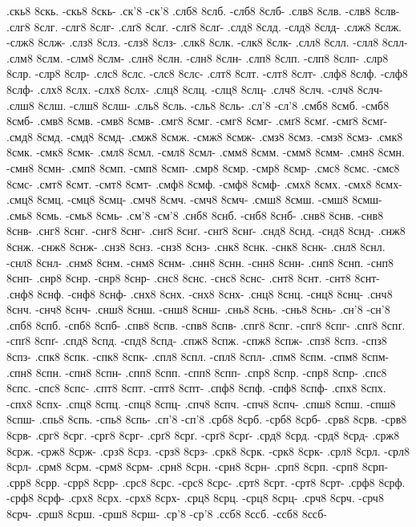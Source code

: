 {.скь8 8скь. -скь8 8скь-
.ск'8 -ск'8
.слб8 8слб. -слб8 8слб-
.слв8 8слв. -слв8 8слв-
.слг8 8слг. -слг8 8слг-
.слґ8 8слґ. -слґ8 8слґ-
.слд8 8слд. -слд8 8слд-
.слж8 8слж. -слж8 8слж-
.слз8 8слз. -слз8 8слз-
.слк8 8слк. -слк8 8слк-
.слл8 8слл. -слл8 8слл-
.слм8 8слм. -слм8 8слм-
.слн8 8слн. -слн8 8слн-
.слп8 8слп. -слп8 8слп-
.слр8 8слр. -слр8 8слр-
.слс8 8слс. -слс8 8слс-
.слт8 8слт. -слт8 8слт-
.слф8 8слф. -слф8 8слф-
.слх8 8слх. -слх8 8слх-
.слц8 8слц. -слц8 8слц-
.слч8 8слч. -слч8 8слч-
.слш8 8слш. -слш8 8слш-
.сль8 8сль. -сль8 8сль-
.сл'8 -сл'8
.смб8 8смб. -смб8 8смб-
.смв8 8смв. -смв8 8смв-
.смг8 8смг. -смг8 8смг-
.смґ8 8смґ. -смґ8 8смґ-
.смд8 8смд. -смд8 8смд-
.смж8 8смж. -смж8 8смж-
.смз8 8смз. -смз8 8смз-
.смк8 8смк. -смк8 8смк-
.смл8 8смл. -смл8 8смл-
.смм8 8смм. -смм8 8смм-
.смн8 8смн. -смн8 8смн-
.смп8 8смп. -смп8 8смп-
.смр8 8смр. -смр8 8смр-
.смс8 8смс. -смс8 8смс-
.смт8 8смт. -смт8 8смт-
.смф8 8смф. -смф8 8смф-
.смх8 8смх. -смх8 8смх-
.смц8 8смц. -смц8 8смц-
.смч8 8смч. -смч8 8смч-
.смш8 8смш. -смш8 8смш-
.смь8 8смь. -смь8 8смь-
.см'8 -см'8
.снб8 8снб. -снб8 8снб-
.снв8 8снв. -снв8 8снв-
.снг8 8снг. -снг8 8снг-
.снґ8 8снґ. -снґ8 8снґ-
.снд8 8снд. -снд8 8снд-
.снж8 8снж. -снж8 8снж-
.снз8 8снз. -снз8 8снз-
.снк8 8снк. -снк8 8снк-
.снл8 8снл. -снл8 8снл-
.снм8 8снм. -снм8 8снм-
.снн8 8снн. -снн8 8снн-
.снп8 8снп. -снп8 8снп-
.снр8 8снр. -снр8 8снр-
.снс8 8снс. -снс8 8снс-
.снт8 8снт. -снт8 8снт-
.снф8 8снф. -снф8 8снф-
.снх8 8снх. -снх8 8снх-
.снц8 8снц. -снц8 8снц-
.снч8 8снч. -снч8 8снч-
.снш8 8снш. -снш8 8снш-
.снь8 8снь. -снь8 8снь-
.сн'8 -сн'8
.спб8 8спб. -спб8 8спб-
.спв8 8спв. -спв8 8спв-
.спг8 8спг. -спг8 8спг-
.спґ8 8спґ. -спґ8 8спґ-
.спд8 8спд. -спд8 8спд-
.спж8 8спж. -спж8 8спж-
.спз8 8спз. -спз8 8спз-
.спк8 8спк. -спк8 8спк-
.спл8 8спл. -спл8 8спл-
.спм8 8спм. -спм8 8спм-
.спн8 8спн. -спн8 8спн-
.спп8 8спп. -спп8 8спп-
.спр8 8спр. -спр8 8спр-
.спс8 8спс. -спс8 8спс-
.спт8 8спт. -спт8 8спт-
.спф8 8спф. -спф8 8спф-
.спх8 8спх. -спх8 8спх-
.спц8 8спц. -спц8 8спц-
.спч8 8спч. -спч8 8спч-
.спш8 8спш. -спш8 8спш-
.спь8 8спь. -спь8 8спь-
.сп'8 -сп'8
.срб8 8срб. -срб8 8срб-
.срв8 8срв. -срв8 8срв-
.срг8 8срг. -срг8 8срг-
.срґ8 8срґ. -срґ8 8срґ-
.срд8 8срд. -срд8 8срд-
.срж8 8срж. -срж8 8срж-
.срз8 8срз. -срз8 8срз-
.срк8 8срк. -срк8 8срк-
.срл8 8срл. -срл8 8срл-
.срм8 8срм. -срм8 8срм-
.срн8 8срн. -срн8 8срн-
.срп8 8срп. -срп8 8срп-
.срр8 8срр. -срр8 8срр-
.срс8 8срс. -срс8 8срс-
.срт8 8срт. -срт8 8срт-
.срф8 8срф. -срф8 8срф-
.срх8 8срх. -срх8 8срх-
.срц8 8срц. -срц8 8срц-
.срч8 8срч. -срч8 8срч-
.срш8 8срш. -срш8 8срш-
.ср'8 -ср'8
.ссб8 8ссб. -ссб8 8ссб-
}
